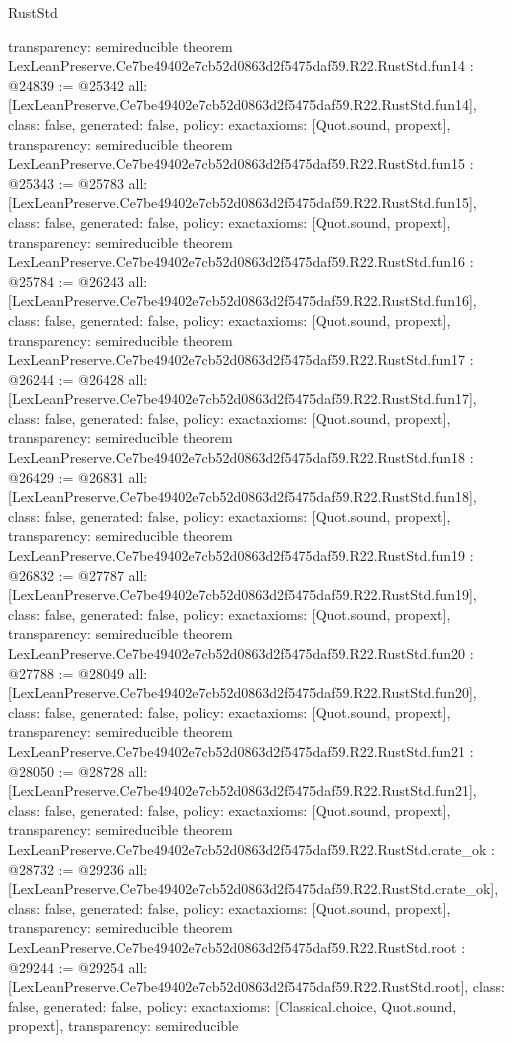 \begin{lexlean}{RustStd}
\begin{coremodule}
{  transparency: semireducible
}
theorem LexLeanPreserve.Ce7be49402e7cb52d0863d2f5475daf59.R22.RustStd.fun14 : @24839 := @25342 {
  all: [LexLeanPreserve.Ce7be49402e7cb52d0863d2f5475daf59.R22.RustStd.fun14],
  class: false,
  generated: false,
  policy: exact{axioms: [Quot.sound, propext]},
  transparency: semireducible
}
theorem LexLeanPreserve.Ce7be49402e7cb52d0863d2f5475daf59.R22.RustStd.fun15 : @25343 := @25783 {
  all: [LexLeanPreserve.Ce7be49402e7cb52d0863d2f5475daf59.R22.RustStd.fun15],
  class: false,
  generated: false,
  policy: exact{axioms: [Quot.sound, propext]},
  transparency: semireducible
}
theorem LexLeanPreserve.Ce7be49402e7cb52d0863d2f5475daf59.R22.RustStd.fun16 : @25784 := @26243 {
  all: [LexLeanPreserve.Ce7be49402e7cb52d0863d2f5475daf59.R22.RustStd.fun16],
  class: false,
  generated: false,
  policy: exact{axioms: [Quot.sound, propext]},
  transparency: semireducible
}
theorem LexLeanPreserve.Ce7be49402e7cb52d0863d2f5475daf59.R22.RustStd.fun17 : @26244 := @26428 {
  all: [LexLeanPreserve.Ce7be49402e7cb52d0863d2f5475daf59.R22.RustStd.fun17],
  class: false,
  generated: false,
  policy: exact{axioms: [Quot.sound, propext]},
  transparency: semireducible
}
theorem LexLeanPreserve.Ce7be49402e7cb52d0863d2f5475daf59.R22.RustStd.fun18 : @26429 := @26831 {
  all: [LexLeanPreserve.Ce7be49402e7cb52d0863d2f5475daf59.R22.RustStd.fun18],
  class: false,
  generated: false,
  policy: exact{axioms: [Quot.sound, propext]},
  transparency: semireducible
}
theorem LexLeanPreserve.Ce7be49402e7cb52d0863d2f5475daf59.R22.RustStd.fun19 : @26832 := @27787 {
  all: [LexLeanPreserve.Ce7be49402e7cb52d0863d2f5475daf59.R22.RustStd.fun19],
  class: false,
  generated: false,
  policy: exact{axioms: [Quot.sound, propext]},
  transparency: semireducible
}
theorem LexLeanPreserve.Ce7be49402e7cb52d0863d2f5475daf59.R22.RustStd.fun20 : @27788 := @28049 {
  all: [LexLeanPreserve.Ce7be49402e7cb52d0863d2f5475daf59.R22.RustStd.fun20],
  class: false,
  generated: false,
  policy: exact{axioms: [Quot.sound, propext]},
  transparency: semireducible
}
theorem LexLeanPreserve.Ce7be49402e7cb52d0863d2f5475daf59.R22.RustStd.fun21 : @28050 := @28728 {
  all: [LexLeanPreserve.Ce7be49402e7cb52d0863d2f5475daf59.R22.RustStd.fun21],
  class: false,
  generated: false,
  policy: exact{axioms: [Quot.sound, propext]},
  transparency: semireducible
}
theorem LexLeanPreserve.Ce7be49402e7cb52d0863d2f5475daf59.R22.RustStd.crate_ok : @28732 := @29236 {
  all: [LexLeanPreserve.Ce7be49402e7cb52d0863d2f5475daf59.R22.RustStd.crate_ok],
  class: false,
  generated: false,
  policy: exact{axioms: [Quot.sound, propext]},
  transparency: semireducible
}
theorem LexLeanPreserve.Ce7be49402e7cb52d0863d2f5475daf59.R22.RustStd.root : @29244 := @29254 {
  all: [LexLeanPreserve.Ce7be49402e7cb52d0863d2f5475daf59.R22.RustStd.root],
  class: false,
  generated: false,
  policy: exact{axioms: [Classical.choice, Quot.sound, propext]},
  transparency: semireducible
}


\end{coremodule}
\end{lexlean}
